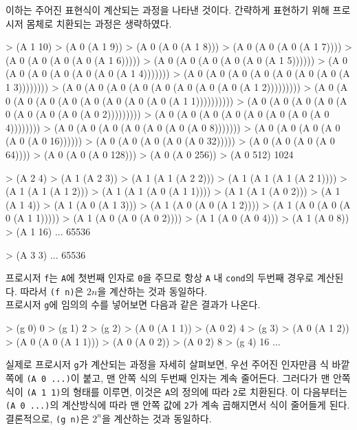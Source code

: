 이하는 주어진 표현식이 계산되는 과정을 나타낸 것이다. 간략하게 표현하기 위해
프로시저 몸체로 치환되는 과정은 생략하였다.

\begin{lisp}
> (A 1 10)
> (A 0 (A 1 9))
> (A 0 (A 0 (A 1 8)))
> (A 0 (A 0 (A 0 (A 1 7))))
> (A 0 (A 0 (A 0 (A 0 (A 1 6)))))
> (A 0 (A 0 (A 0 (A 0 (A 0 (A 1 5))))))
> (A 0 (A 0 (A 0 (A 0 (A 0 (A 0 (A 1 4)))))))
> (A 0 (A 0 (A 0 (A 0 (A 0 (A 0 (A 0 (A 1 3))))))))
> (A 0 (A 0 (A 0 (A 0 (A 0 (A 0 (A 0 (A 0 (A 1 2)))))))))
> (A 0 (A 0 (A 0 (A 0 (A 0 (A 0 (A 0 (A 0 (A 0 (A 1 1))))))))))
> (A 0 (A 0 (A 0 (A 0 (A 0 (A 0 (A 0 (A 0 (A 0 2)))))))))
> (A 0 (A 0 (A 0 (A 0 (A 0 (A 0 (A 0 (A 0 4))))))))
> (A 0 (A 0 (A 0 (A 0 (A 0 (A 0 (A 0 8)))))))
> (A 0 (A 0 (A 0 (A 0 (A 0 (A 0 16))))))
> (A 0 (A 0 (A 0 (A 0 (A 0 32)))))
> (A 0 (A 0 (A 0 (A 0 64))))
> (A 0 (A 0 (A 0 128)))
> (A 0 (A 0 256))
> (A 0 512)
1024
\end{lisp}

\begin{lisp}
> (A 2 4)
> (A 1 (A 2 3))
> (A 1 (A 1 (A 2 2)))
> (A 1 (A 1 (A 1 (A 2 1))))
> (A 1 (A 1 (A 1 2)))
> (A 1 (A 1 (A 0 (A 1 1))))
> (A 1 (A 1 (A 0 2)))
> (A 1 (A 1 4))
> (A 1 (A 0 (A 1 3)))
> (A 1 (A 0 (A 0 (A 1 2))))
> (A 1 (A 0 (A 0 (A 0 (A 1 1)))))
> (A 1 (A 0 (A 0 (A 0 2))))
> (A 1 (A 0 (A 0 4)))
> (A 1 (A 0 8))
> (A 1 16)
  ...
65536
\end{lisp}

\begin{lisp}
> (A 3 3)
  ...
65536
\end{lisp}

프로시저 \texttt{f}는 \texttt{A}에 첫번째
인자로 \texttt{0}을 주므로 항상 \texttt{A} 내 \texttt{cond}의 두번째 경우로
계산된다. 따라서 \texttt{(f n)}은 $2n$을 계산하는 것과 동일하다.\\

프로시저 \texttt{g}에 임의의 수를 넣어보면 다음과 같은 결과가 나온다.

\begin{lisp}
> (g 0)
0
> (g 1)
2
> (g 2)
> (A 0 (A 1 1))
> (A 0 2)
4
> (g 3)
> (A 0 (A 1 2))
> (A 0 (A 0 (A 1 1)))
> (A 0 (A 0 2))
> (A 0 2)
8
> (g 4)
16
  ...
\end{lisp}

실제로 프로시저 \texttt{g}가 계산되는 과정을 자세히 살펴보면, 우선 주어진 인자만큼
식 바깥쪽에 \texttt{(A 0 ...)}이 붙고, 맨 안쪽 식의 두번째 인자는 계속
줄어든다. 그러다가 맨 안쪽 식이 \texttt{(A 1 1)}의 형태를 이루면, 이것은
\texttt{A}의 정의에 따라 \texttt{2}로 치환된다. 이 다음부터는 \texttt{(A 0
  ...)}의 계산방식에 따라 맨 안쪽 값에 \texttt{2}가 계속 곱해지면서 식이
줄어들게 된다. 결론적으로, \texttt{(g~n)}은 $2^n$을 계산하는 것과 동일하다.\\

